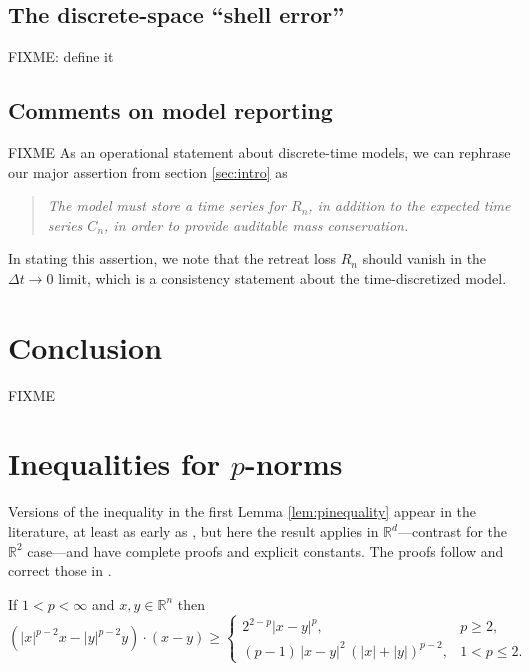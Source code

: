 \documentclass[final,leqno,onefignum,onetabnum]{siamltex1213bueler}
\newcommand\RR{\mathbb{R}}
\begin{document}
\subsection{The discrete-space ``shell error''}  \label{subsec:shellerror}  FIXME: define it

\subsection{Comments on model reporting}  \label{subsec:comments}  FIXME As an operational statement about discrete-time models, we can rephrase our major assertion from section \ref{sec:intro} as
\begin{quote}
\emph{The model must store a time series for $R_n$, in addition to the expected time series $C_n$, in order to provide auditable mass conservation.}
\end{quote}
In stating this assertion, we note that the retreat loss $R_n$ should vanish in the $\Delta t\to 0$ limit, which is a consistency statement about the time-discretized model.


\section{Conclusion} \label{sec:conclusion}  FIXME






\appendix

\section{Inequalities for $p$-norms}   \label{app:pinequalities}  Versions of the inequality in the first Lemma \eqref{lem:pinequality} appear in the literature, at least as early as \cite{GlowinskiMarroco1975}, but here the result applies in $\RR^d$---contrast \cite{BarrettLiu1993,GlowinskiMarroco1975} for the $\RR^2$ case---and have complete proofs and explicit constants.  The proofs follow and correct those in \cite[Appendix A]{Peral1997}.

\begin{lemma}  \label{lem:pinequality}  If $1<p<\infty$ and $x,y\in\RR^n$ then
\begin{equation}
\left(|x|^{p-2} x - |y|^{p-2} y\right)\cdot(x-y) \ge
   \begin{cases}
       2^{2-p} |x-y|^p, & p\ge 2, \\
       (p-1)\, |x-y|^2 \, \left(|x|+|y|\right)^{p-2}, & 1 < p \le 2.
   \end{cases} \label{eq:pinequality}
\end{equation}
\end{lemma}
\end{document}
